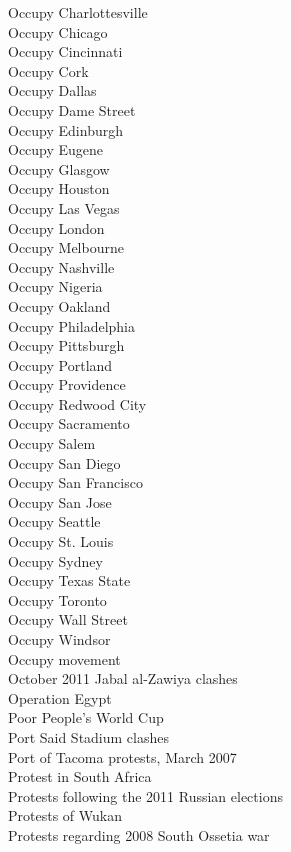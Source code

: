 Occupy Charlottesville\\
Occupy Chicago\\
Occupy Cincinnati\\
Occupy Cork\\
Occupy Dallas\\
Occupy Dame Street\\
Occupy Edinburgh\\
Occupy Eugene\\
Occupy Glasgow\\
Occupy Houston\\
Occupy Las Vegas\\
Occupy London\\
Occupy Melbourne\\
Occupy Nashville\\
Occupy Nigeria\\
Occupy Oakland\\
Occupy Philadelphia\\
Occupy Pittsburgh\\
Occupy Portland\\
Occupy Providence\\
Occupy Redwood City\\
Occupy Sacramento\\
Occupy Salem\\
Occupy San Diego\\
Occupy San Francisco\\
Occupy San Jose\\
Occupy Seattle\\
Occupy St. Louis\\
Occupy Sydney\\
Occupy Texas State\\
Occupy Toronto\\
Occupy Wall Street\\
Occupy Windsor\\
Occupy movement\\
October 2011 Jabal al-Zawiya clashes\\
Operation Egypt\\
Poor People's World Cup\\
Port Said Stadium clashes\\
Port of Tacoma protests, March 2007\\
Protest in South Africa\\
Protests following the 2011 Russian elections\\
Protests of Wukan\\
Protests regarding 2008 South Ossetia war\\
